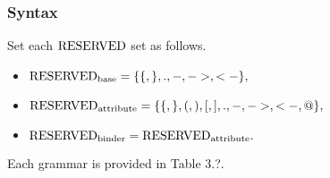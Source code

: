 \subsubsection*{Syntax}
Set each $\mathrm{RESERVED}$ set as follows. %
\begin{itemize}
\item $\mathrm{RESERVED}_{\textrm{base}} = \{\{, \}, ., -, ->, <-\},$
\item $\mathrm{RESERVED}_{\textrm{attribute}} = \{\{, \}, (, ), [, ], ., -, ->, <-, @\},$
\item $\mathrm{RESERVED}_{\textrm{binder}} = \mathrm{RESERVED}_{\textrm{attribute}}.$
\end{itemize}
Each grammar is provided in Table 3.?.



